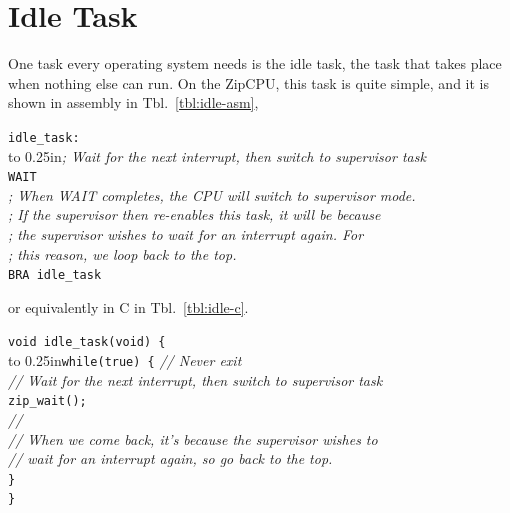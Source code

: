 \documentclass{gqtekspec}
\begin{document}
\section{Idle Task}
One task every operating system needs is the idle task, the task that takes
place when nothing else can run.  On the ZipCPU, this task is quite simple,
and it is shown in assembly in Tbl.~\ref{tbl:idle-asm},
\begin{table}\begin{center}
\begin{tabbing}
{\tt idle\_task:} \\
\hbox to 0.25in{}\= {\em ; Wait for the next interrupt, then switch to supervisor task} \\
\>        {\tt WAIT} \\
\>        {\em ; When WAIT completes, the CPU will switch to supervisor mode.}\\
\>        {\em ; If the supervisor then re-enables this task, it will be because}\\
\>        {\em ;  the supervisor wishes to wait for an interrupt again.  For}\\
\>        {\em ; this reason, we loop back to the top.} \\
\>        {\tt BRA idle\_task} \\
\end{tabbing}
\caption{Example Idle Task in Assembly}\label{tbl:idle-asm}
\end{center}\end{table}
or equivalently in C in Tbl.~\ref{tbl:idle-c}.
\begin{table}\begin{center}
\begin{tabbing}
{\tt void idle\_task(void) \{} \\
\hbox to 0.25in{}\={\tt while(true) \{} {\em // Never exit}\\
\> {\em // Wait for the next interrupt, then switch to supervisor task} \\

\> {\tt zip\_wait();} \\
\> {\em // } \\
\> {\em // When we come back, it's because the supervisor wishes to} \\
\> {\em // wait for an interrupt again, so go back to the top.} \\
\> {\tt \}} \\
{\tt \}}
\end{tabbing}
\caption{Example Idle Task in C}\label{tbl:idle-c}
\end{center}\end{table}
\end{document}
